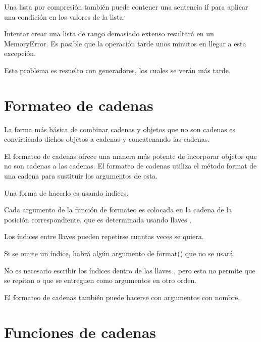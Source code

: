 \documentclass{report}
\begin{document}
Una lista por compresión también puede contener una sentencia if para aplicar una condición en los valores de la lista.


Intentar crear una lista de rango demasiado extenso resultará en un MemoryError. Es posible que la operación tarde unos minutos en llegar a esta excepción.


Este problema es resuelto con generadores, los cuales se verán más tarde.

\section{Formateo de cadenas}

La forma más básica de combinar cadenas y objetos que no son cadenas es convirtiendo dichos objetos a cadenas y concatenando las cadenas.

El formateo de cadenas ofrece una manera más potente de incorporar objetos que no son cadenas a las cadenas. El formateo de cadenas utiliza el método format de una cadena para sustituir los argumentos de esta.

Una forma de hacerlo es usando índices.


Cada argumento de la función de formateo es colocada en la cadena de la posición correspondiente, que es determinada usando llaves {}.

Los índices entre llaves {} pueden repetirse cuantas veces se quiera.


Si se omite un índice, habrá algún argumento de format() que no se usará.


No es necesario escribir los índices dentro de las llaves {}, pero esto no permite que se repitan o que se entreguen como argumentos en otro orden.


El formateo de cadenas también puede hacerse con argumentos con nombre.


\section{Funciones de cadenas}
\end{document}
